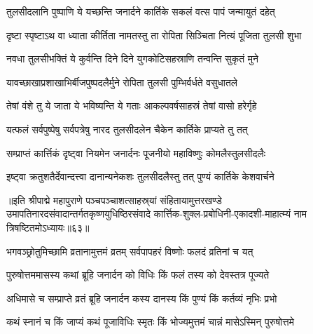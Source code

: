 \twolineshloka
{तुलसीदलानि पुष्पाणि ये यच्छन्ति जनार्दने}
{कार्तिके सकलं वत्स पापं जन्मायुतं दहेत्}%

\twolineshloka
{दृष्टा स्पृष्टाऽथ वा ध्याता कीर्तिता नामतस्तु ता}
{रोपिता सिञ्चिता नित्यं पूजिता तुलसी शुभा}%

\twolineshloka
{नवधा तुलसीभक्तिं ये कुर्वन्ति दिने दिने}
{युगकोटिसहस्राणि तन्वन्ति सुकृतं मुने}%

\twolineshloka
{यावच्छाखाप्रशाखाभिर्बीजपुष्पदलैर्मुने}
{रोपिता तुलसी पुम्भिर्वर्धते वसुधातले}%

\twolineshloka
{तेषां वंशे तु ये जाता ये भविष्यन्ति ये गताः}
{आकल्पवर्षसाहस्रं तेषां वासो हरेर्गृहे}%

\twolineshloka
{यत्फलं सर्वपुष्पेषु सर्वपत्रेषु नारद}
{तुलसीदलेन चैकेन कार्तिके प्राप्यते तु तत्}%

\twolineshloka
{सम्प्राप्तं कार्त्तिकं दृष्ट्वा नियमेन जनार्दनः}
{पूजनीयो महाविष्णुः कोमलैस्तुलसीदलैः}%

\twolineshloka
{इष्ट्वा क्रतुशतैर्देवान्दत्त्वा दानान्यनेकशः}
{तुलसीदलैस्तु तत् पुण्यं कार्तिके केशवार्चने}%

॥इति श्रीपाद्मे महापुराणे पञ्चपञ्चाशत्साहस्र्यां संहितायामुत्तरखण्डे उमापतिनारदसंवादान्तर्गतकृष्णयुधिष्ठिरसंवादे कार्त्तिक-शुक्ल-प्रबोधिनी-एकादशी-माहात्म्यं नाम त्रिषष्टितमोऽध्यायः॥६३॥

\genMangalaShloka

\hyperref[sec:ekadashi_mahatmyam_padma_puranam]{\closesub}
\clearpage

\label{sec:padma-purushottama-shukla-kamala}

\ganapatyadiDhyanam
\padmaPuranam



\twolineshloka
{भगवञ्छ्रोतुमिच्छामि व्रतानामुत्तमं व्रतम्}
{सर्वपापहरं विष्णोः फलदं व्रतिनां च यत्}%

\twolineshloka
{पुरुषोत्तममासस्य कथां ब्रूहि जनार्दन}
{को विधिः किं फलं तस्य को देवस्तत्र पूज्यते}%

\twolineshloka
{अधिमासे च सम्प्राप्ते व्रतं ब्रूहि जनार्दन}
{कस्य दानस्य किं पुण्यं किं कर्तव्यं नृभिः प्रभो}%

\twolineshloka
{कथं स्नानं च किं जाप्यं कथं पूजाविधिः स्मृतः}
{किं भोज्यमुत्तमं चान्नं मासेऽस्मिन् पुरुषोत्तमे}%


